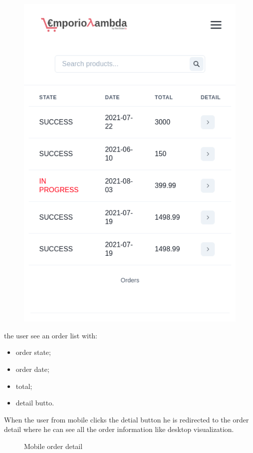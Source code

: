 \begin{itemize}
\begin{figure}[!ht]
              \includegraphics[scale=0.5]{../../../../Images/userManual/orderMobile.png}
              \centering
          \end{figure}
          the user see an order list with:
          \begin{itemize}
              \item order state;
              \item order date;
              \item total;
              \item detail butto.
          \end{itemize}
          When the user from mobile clicks the detial button he is redirected to the order detail where he can see all the order information like desktop visualization.
          \begin{figure}[!ht]
              \caption{Mobile order detail}

\end{figure}
\end{itemize}
